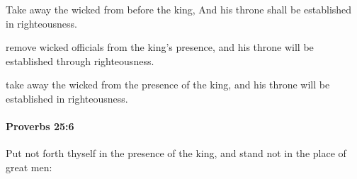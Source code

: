 			\begin{versebox}
					\item[BHS] 
					\item[ASV] Take away the wicked from before the king, And his throne shall be established in righteousness.
					\item[NIV] remove wicked officials from the king’s presence, and his throne will be established through righteousness.
					\item[NRSV] take away the wicked from the presence of the king, and his throne will be established in righteousness.
			\end{versebox}

		\paragraph{Proverbs 25:6} %
			\label{PROVERBS-25-6}

			Put not forth thyself in the presence of the king, and stand not in the place of great men:

